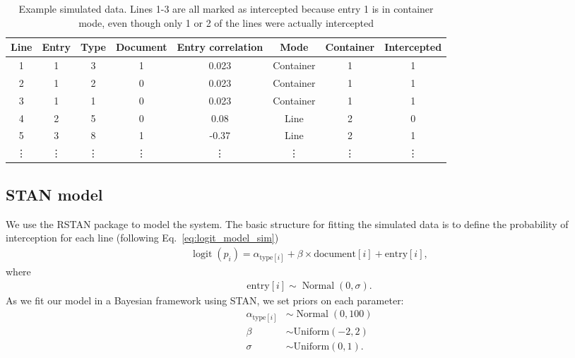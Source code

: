 \documentclass{article}
\DeclareMathOperator{\logit}{logit}
\DeclareMathOperator{\Normal}{Normal}
\begin{document}
\vspace{0.1cm}
\begin{table}[h]
\caption{Example simulated data. Lines 1-3 are all marked as intercepted because entry 1 is in container mode, even though only 1 or 2 of the lines were actually intercepted}
\label{table:example_data}
\begin{center}

\begin{tabular}{|c|c|c|c|c|c|c|c|}
\hline 
Line & Entry & Type & Document & Entry correlation & Mode & Container & Intercepted \\ 
\hline 
1 & 1 & 3 & 1 & 0.023 & Container & 1 & 1 \\ 
\hline 
2 & 1 & 2 & 0 & 0.023 &Container & 1 & 1 \\ 
\hline 
3 & 1 & 1 & 0 & 0.023 &Container & 1 & 1 \\ 
\hline 
4 & 2 & 5 & 0 & 0.08 &Line & 2 & 0 \\ 
\hline 
5 & 3 & 8 & 1 & -0.37 &Line & 2 & 1 \\ 
\hline 
\vdots & \vdots & \vdots & \vdots & \vdots & \vdots & \vdots & \vdots \\ 
\hline 
\end{tabular} 

\end{center}
\end{table}

\subsection{STAN model}
We use the RSTAN package to model the system. The basic structure for fitting the simulated data is to define the probability of interception for each line (following Eq.~\eqref{eq:logit_model_sim})
\begin{align}
\logit(p_i) = \alpha_{\text{type}[i]} + \beta\times\text{document}[i] + \text{entry}[i], \label{eq:logit_model_fit_sim}
\end{align}
where 
\begin{align}
\text{entry}[i]\sim\Normal(0,\sigma).
\end{align}
As we fit our model in a Bayesian framework using STAN, we set priors on each parameter:
\begin{align}
\alpha_{\text{type}[i]} &\sim \Normal(0, 100)\\
\beta&\sim \text{Uniform}(-2,2)\\
\sigma&\sim \text{Uniform}(0,1).
\end{align}
\end{document}

